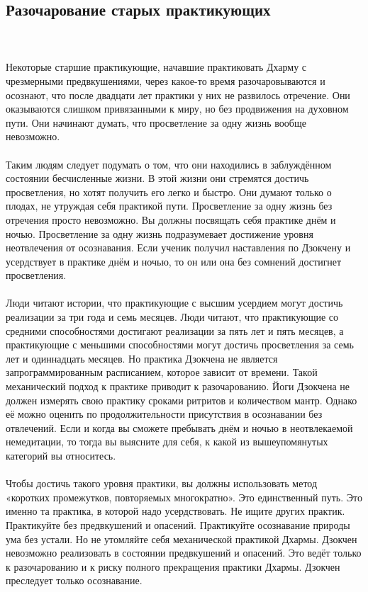 \subsection{Разочарование старых практикующих}
\\ \\ Некоторые старшие практикующие, начавшие практиковать Дхарму с чрезмерными предвкушениями, через какое-то время разочаровываются и осознают, что после двадцати лет практики у них не развилось отречение. Они оказываются слишком привязанными к миру, но без продвижения на духовном пути. Они начинают думать, что просветление за одну жизнь вообще невозможно.
\\ \\ Таким людям следует подумать о том, что они находились в заблуждённом состоянии бесчисленные жизни. В этой жизни они стремятся достичь просветления, но хотят получить его легко и быстро. Они думают только о плодах, не утруждая себя практикой пути. Просветление за одну жизнь без отречения просто невозможно. Вы должны посвящать себя практике днём и ночью. Просветление за одну жизнь подразумевает достижение уровня неотвлечения от осознавания. Если ученик получил наставления по Дзокчену и усердствует в практике днём и ночью, то он или она без сомнений достигнет просветления.
\\ \\ Люди читают истории, что практикующие с высшим усердием могут достичь реализации за три года и семь месяцев. Люди читают, что практикующие со средними способностями достигают реализации за пять лет и пять месяцев, а практикующие с меньшими способностями могут достичь просветления за семь лет и одиннадцать месяцев. Но практика Дзокчена не является запрограммированным расписанием, которое зависит от времени. Такой механический подход к практике приводит к разочарованию. Йоги Дзокчена не должен измерять свою практику сроками ритритов и количеством мантр. Однако её можно оценить по продолжительности присутствия в осознавании без отвлечений. Если и когда вы сможете пребывать днём и ночью в неотвлекаемой немедитации, то тогда вы выясните для себя, к какой из вышеупомянутых категорий вы относитесь.
\\ \\ Чтобы достичь такого уровня практики, вы должны использовать метод «коротких промежутков, повторяемых многократно». Это единственный путь. Это именно та практика, в которой надо усердствовать. Не ищите других практик. Практикуйте без предвкушений и опасений. Практикуйте осознавание природы ума без устали. Но не утомляйте себя механической практикой Дхармы. Дзокчен невозможно реализовать в состоянии предвкушений и опасений. Это ведёт только к разочарованию и к риску полного прекращения практики Дхармы. Дзокчен преследует только осознавание.
